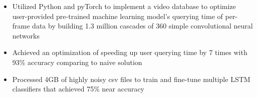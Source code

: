 \documentclass{resume}
\begin{document}
\vspace{-2ex}
\begin{itemize}
	\item Utilized Python and pyTorch to implement a video database to optimize user-provided pre-trained machine learning model's querying time of per-frame data by building 1.3 million cascades of 360 simple convolutional neural networks
	\item Achieved an optimization of speeding up user querying time by 7 times with 93\% accuracy comparing to naive solution
	\item Processed 4GB of highly noisy csv files to train and fine-tune multiple LSTM classifiers that achieved 75\% near accuracy %
\end{itemize}

\end{document}

